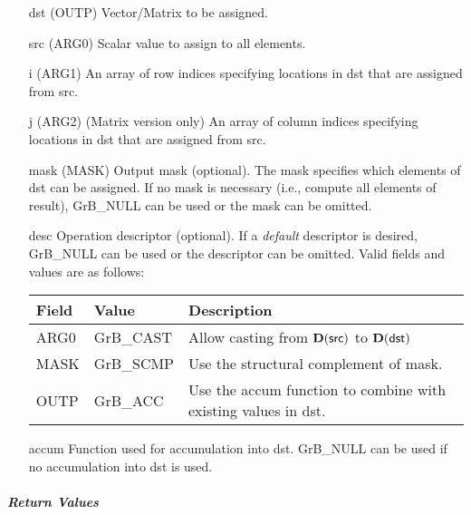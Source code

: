 \begin{itemize}[leftmargin=1.1in]
    \item[{\sf dst}]   ({\sf OUTP}) Vector/Matrix to be assigned.
    \item[{\sf src}]   ({\sf ARG0}) Scalar value to assign to all elements.
    \item[{\sf i}]     ({\sf ARG1}) An array of row indices specifying locations in dst that
                       are assigned from src.
    \item[{\sf j}]     ({\sf ARG2}) (Matrix version only) An array of column indices 
                       specifying locations in dst that are assigned from src.

    \item[{\sf mask}]  (MASK) Output mask (optional). The mask
    specifies which elements of {\sf dst} can be assigned.
    If no mask is necessary (i.e., compute all elements of result),
    {\sf GrB\_NULL} can be used or the mask can be omitted.

    \item[{\sf desc}]   Operation descriptor (optional). If a
    \emph{default} descriptor is desired, {\sf GrB\_NULL} can be
    used or the descriptor can be omitted.  Valid fields and values are as follows: \\
    \begin{tabular}{lll}
    Field  & Value & Description \\
    \hline
    {\sf ARG0} & {\sf GrB\_CAST} & Allow casting from $\bold{D}({\sf src})$ to $\bold{D}({\sf dst})$ \\
    {\sf MASK} & {\sf GrB\_SCMP} & Use the structural complement of {\sf mask}. \\
    {\sf OUTP}& {\sf GrB\_ACC}  & Use the {\sf accum} function to combine with existing values in {\sf dst}.\\
    \end{tabular}

    \item[{\sf accum}] Function used for accumulation into dst.  {\sf GrB\_NULL}
                       can be used if no accumulation into dst is used.
\end{itemize}

\subparagraph{Return Values}

